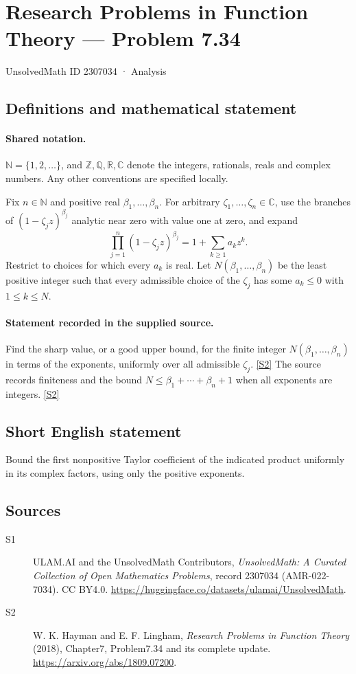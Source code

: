 \documentclass[11pt]{article}
\newcommand{\sref}[2]{\hyperlink{source:#1:#2}{[S#2]}}
\begin{document}
\setcounter{section}{2307033}
\section{Research Problems in Function Theory — Problem 7.34}\label{2307034}
{\small\sffamily UnsolvedMath ID 2307034 · Analysis}
\subsection{Definitions and mathematical statement}

\paragraph{Shared notation.}$\mathbb N=\{1,2,\ldots\}$, and $\mathbb Z,\mathbb Q,\mathbb R,\mathbb C$ denote the integers, rationals, reals and complex numbers. Any other conventions are specified locally.


Fix $n\in\mathbb N$ and positive real $\beta_1,\ldots,\beta_n$. For arbitrary $\zeta_1,\ldots,\zeta_n\in\mathbb C$, use the branches of $(1-\zeta_jz)^{\beta_j}$ analytic near zero with value one at zero, and expand
\[\prod_{j=1}^n(1-\zeta_jz)^{\beta_j}=1+\sum_{k\ge1}a_kz^k.\]
Restrict to choices for which every $a_k$ is real. Let $N(\beta_1,\ldots,\beta_n)$ be the least positive integer such that every admissible choice of the $\zeta_j$ has some $a_k\le0$ with $1\le k\le N$.

\paragraph{Statement recorded in the supplied source.}
Find the sharp value, or a good upper bound, for the finite integer $N(\beta_1,\ldots,\beta_n)$ in terms of the exponents, uniformly over all admissible $\zeta_j$. \sref{2307034}{2}
The source records finiteness and the bound $N\le\beta_1+\cdots+\beta_n+1$ when all exponents are integers. \sref{2307034}{2}
\subsection{Short English statement}
Bound the first nonpositive Taylor coefficient of the indicated product uniformly in its complex factors, using only the positive exponents.
\subsection{Sources}
\begin{description}
\item[\hypertarget{source:2307034:1}{S1}] ULAM.AI and the UnsolvedMath Contributors, \emph{UnsolvedMath: A Curated Collection of Open Mathematics Problems}, record 2307034 (AMR-022-7034). CC BY4.0. \url{https://huggingface.co/datasets/ulamai/UnsolvedMath}.
\item[\hypertarget{source:2307034:2}{S2}] W. K. Hayman and E. F. Lingham, \emph{Research Problems in Function Theory} (2018), Chapter7, Problem7.34 and its complete update. \url{https://arxiv.org/abs/1809.07200}.
\end{description}
\label{end:2307034}
\end{document}
